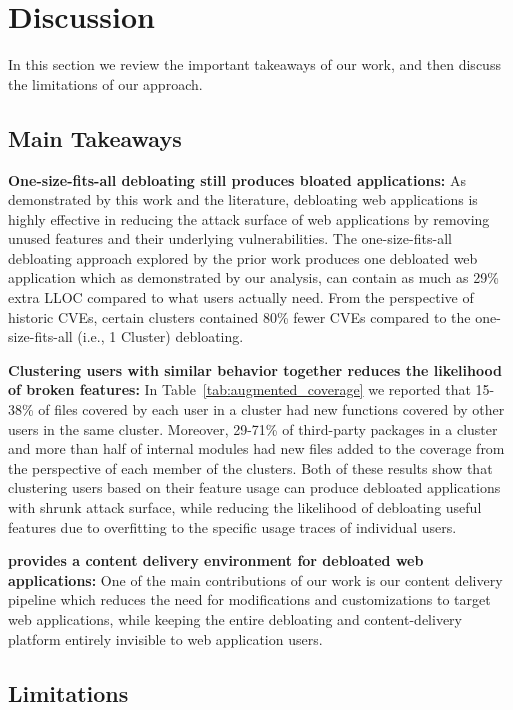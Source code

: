 \section{Discussion}

In this section we review the important takeaways of our work, and then discuss the limitations of our approach.

\subsection{Main Takeaways}

\noindent\textbf{One-size-fits-all debloating still produces bloated applications:} 
As demonstrated by this work and the literature, debloating web applications is highly effective in reducing the attack surface of web applications by removing unused features and their underlying vulnerabilities. 
The one-size-fits-all debloating approach explored by the prior work produces one debloated web application which as demonstrated by our analysis, can contain as much as 29\% extra LLOC compared to what users actually need. 
From the perspective of historic CVEs, certain clusters contained 80\% fewer CVEs compared to the one-size-fits-all (i.e., 1 Cluster) debloating. 

\noindent\textbf{Clustering users with similar behavior together reduces the likelihood of broken features:} 
In Table~\ref{tab:augmented_coverage} we reported that 15-38\% of files covered by each user in a cluster had new functions covered by other users in the same cluster. 
Moreover, 29-71\% of third-party packages in a cluster and more than half of internal modules had new files added to the coverage from the perspective of each member of the clusters. 
Both of these results show that clustering users based on their feature usage can produce debloated applications with shrunk attack surface, while reducing the likelihood of debloating useful features due to overfitting to the specific usage traces of individual users. 

\noindent\textbf{\dbltr{} provides a content delivery environment for debloated web applications:} 
One of the main contributions of our work is our content delivery pipeline which reduces the need for modifications and customizations to target web applications, while keeping the entire debloating and content-delivery platform entirely invisible to web application users.

\subsection{Limitations} 

